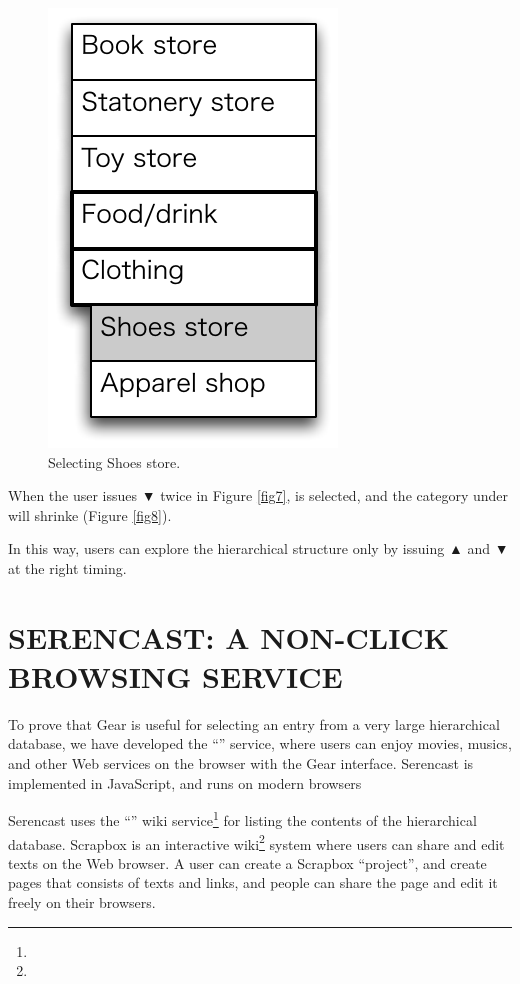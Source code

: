 \documentclass{article}
\def\up{▲}
\def\down{▼}
\def\SC{\textsf{\small Serencast}}
\def\SB{\textsf{\small Scrapbox}}
\begin{document}
\begin{figure}[H]
\centerline{\includegraphics[width=\menuwidth,bb=0 0 139 211]{figures/fig9.pdf}}
\caption{Selecting Shoes store.}
\label{fig9}
\end{figure}

When the user issues {\down} twice in Figure \ref{fig7},
 is selected, and the category under  will shrinke (Figure \ref{fig8}).

In this way, users can explore the hierarchical structure
only by issuing {\up} and {\down} at the right timing.

\section{SERENCAST: A NON-CLICK BROWSING SERVICE}


To prove that Gear is useful for selecting an entry from a very
large hierarchical database,
we have developed the ``'' service, where
users can enjoy movies, musics, and other Web services
on the browser with the Gear interface.
{\SC} is implemented in JavaScript, and runs on modern browsers 

{\SC} uses the ``'' wiki service\footnote{
} for listing the contents of the hierarchical database.
{\SB} is an interactive wiki\footnote{
} system where users can share and edit texts on the Web browser.
A user can create a {\SB} ``project'', and create pages
that consists of texts and links,
and people can share the page and edit it freely on their browsers.
\end{document}
